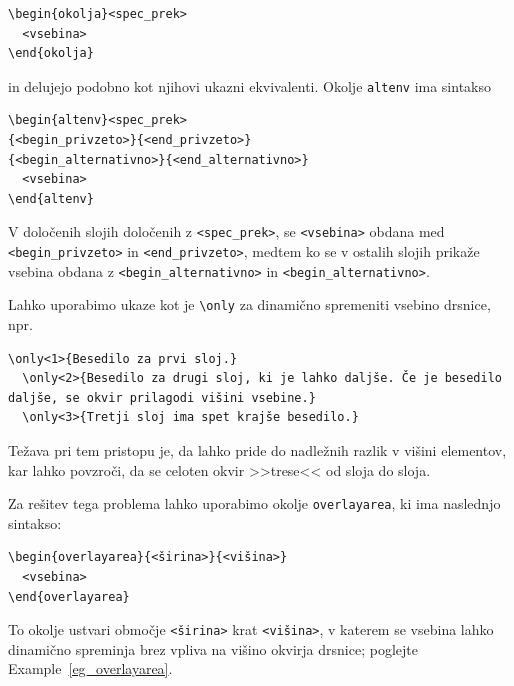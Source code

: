 \begin{verbatim}
\begin{okolja}<spec_prek>
  <vsebina>
\end{okolja}
\end{verbatim}

in delujejo podobno kot njihovi ukazni ekvivalenti.
Okolje \texttt{altenv} ima sintakso

\begin{verbatim}
\begin{altenv}<spec_prek>
{<begin_privzeto>}{<end_privzeto>}
{<begin_alternativno>}{<end_alternativno>}
  <vsebina>
\end{altenv}
\end{verbatim}

V določenih slojih določenih z \texttt{\textless spec\_prek\textgreater }, se \texttt{\textless vsebina\textgreater } obdana med \texttt{\textless begin\_privzeto\textgreater } in \texttt{\textless end\_privzeto\textgreater }, medtem ko se v ostalih slojih prikaže vsebina obdana z \texttt{\textless begin\_alternativno\textgreater } in \texttt{\textless begin\_alternativno\textgreater }.

Lahko uporabimo ukaze kot je \texttt{{\textbackslash}only} za dinamično spremeniti vsebino drsnice, npr.

\begin{verbatim}
\only<1>{Besedilo za prvi sloj.}
  \only<2>{Besedilo za drugi sloj, ki je lahko daljše. Če je besedilo daljše, se okvir prilagodi višini vsebine.}
  \only<3>{Tretji sloj ima spet krajše besedilo.}
\end{verbatim}

Težava pri tem pristopu je, da lahko pride do nadležnih razlik v višini
elementov, kar lahko povzroči, da se celoten okvir >>trese<< od sloja do sloja.

Za rešitev tega problema lahko uporabimo okolje \texttt{overlayarea}, ki ima naslednjo sintakso:

\begin{verbatim}
\begin{overlayarea}{<širina>}{<višina>}
  <vsebina>
\end{overlayarea}
\end{verbatim}

To okolje ustvari območje \texttt{\textless širina\textgreater } krat \texttt{\textless višina\textgreater }, v katerem se vsebina lahko dinamično spreminja brez vpliva na višino okvirja drsnice; poglejte Example~\ref{eg_overlayarea}.

